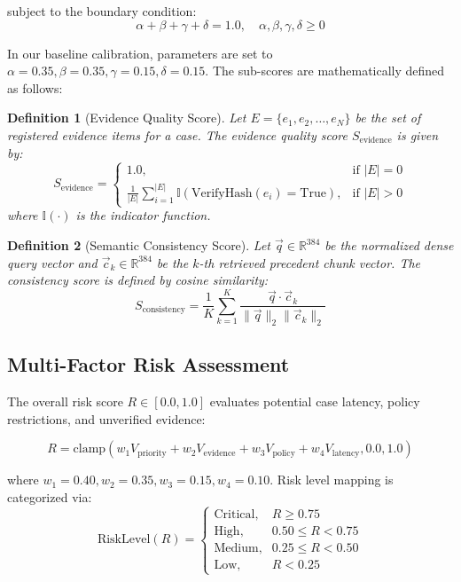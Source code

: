\documentclass[10pt,conference,two-column]{IEEEtran}
\newtheorem{definition}{Definition}
\begin{document}
\begin{table}[t]
subject to the boundary condition:
\begin{equation}
\alpha + \beta + \gamma + \delta = 1.0, \quad \alpha,\beta,\gamma,\delta \ge 0
\label{eq:weights}
\end{equation}

In our baseline calibration, parameters are set to $\alpha=0.35, \beta=0.35, \gamma=0.15, \delta=0.15$. The sub-scores are mathematically defined as follows:

\begin{definition}[Evidence Quality Score]
Let $E = \{e_1, e_2, \dots, e_N\}$ be the set of registered evidence items for a case. The evidence quality score $S_{\text{evidence}}$ is given by:
\begin{equation}
S_{\text{evidence}} = \begin{cases}
1.0, & \text{if } |E| = 0 \\
\frac{1}{|E|} \sum_{i=1}^{|E|} \mathbb{I}(\text{VerifyHash}(e_i) = \text{True}), & \text{if } |E| > 0
\end{cases}
\end{equation}
where $\mathbb{I}(\cdot)$ is the indicator function.
\end{definition}

\begin{definition}[Semantic Consistency Score]
Let $\vec{q} \in \mathbb{R}^{384}$ be the normalized dense query vector and $\vec{c}_k \in \mathbb{R}^{384}$ be the $k$-th retrieved precedent chunk vector. The consistency score is defined by cosine similarity:
\begin{equation}
S_{\text{consistency}} = \frac{1}{K} \sum_{k=1}^K \frac{\vec{q} \cdot \vec{c}_k}{\|\vec{q}\|_2 \|\vec{c}_k\|_2}
\end{equation}
\end{definition}

\subsection{Multi-Factor Risk Assessment}
The overall risk score $R \in [0.0, 1.0]$ evaluates potential case latency, policy restrictions, and unverified evidence:

\begin{equation}
R = \text{clamp}\left( w_1 V_{\text{priority}} + w_2 V_{\text{evidence}} + w_3 V_{\text{policy}} + w_4 V_{\text{latency}}, 0.0, 1.0 \right)
\end{equation}

where $w_1=0.40, w_2=0.35, w_3=0.15, w_4=0.10$. Risk level mapping is categorized via:
\begin{equation}
\text{RiskLevel}(R) = \begin{cases}
\text{Critical}, & R \ge 0.75 \\
\text{High}, & 0.50 \le R < 0.75 \\
\text{Medium}, & 0.25 \le R < 0.50 \\
\text{Low}, & R < 0.25
\end{cases}
\end{equation}


\end{table}
\end{document}
